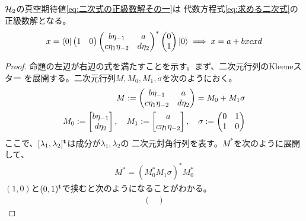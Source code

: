 {	\begin{proposition}[二次式の正級数解]\label{prop:二次式の正級数解} %
		${{\mathcal{H}}}_2$の真空期待値\eqref{eq:二次式の正級数解その一}は
		代数方程式\eqref{eq:求める二次式}の正級数解となる。
		\begin{equation*}\begin{split}
			x = \mathinner{\langle{0}|}\begin{pmatrix}
				1 & 0
			\end{pmatrix}\begin{pmatrix}
				b\eta_{-1} & a \\
				c\eta_1\eta_{-2} & d\eta_2
			\end{pmatrix}^*\begin{pmatrix}
				0 \\ 1
			\end{pmatrix}\mathinner{|{0}\rangle} \implies x = a + bxcxd
		\end{split}\end{equation*}
	\end{proposition} %
	\begin{proof} %
		命題の左辺が右辺の式を満たすことを示す。まず、二次元行列のKleeneスター
		を展開する。二次元行列$M,M_0,M_1,\sigma$を次のようにおく。
		\begin{equation*}\begin{split}
			M := \begin{pmatrix}
				b\eta_{-1} & a \\
				c\eta_1\eta_{-2} & d\eta_2
			\end{pmatrix} = M_0 + M_1\sigma \\
			M_0 := \begin{bmatrix}{b\eta_{-1}}\\{d\eta_2}\end{bmatrix}
			,\quad M_1 := \begin{bmatrix}{a}\\{c\eta_1\eta_{-2}}\end{bmatrix}
			,\quad \sigma := \begin{pmatrix}
				0 & 1 \\ 1 & 0
			\end{pmatrix}
		\end{split}\end{equation*}
		ここで、$[\lambda_1,\lambda_2]^{\mathbf{t}}$は成分が$\lambda_1,\lambda_2$の
		二次元対角行列を表す。$M^*$を次のように展開して、
		\begin{equation*}\begin{split}
			M^* = (M_0^*M_1\sigma)^*M_0^*
		\end{split}\end{equation*}
		$(1,0)$と$(0,1)^{\mathbf{t}}$で挟むと次のようになることがわかる。
		\begin{equation*}\begin{split}
			\begin{pmatrix}

\end{pmatrix}
\end{split}
\end{equation*}
\end{proof}}

